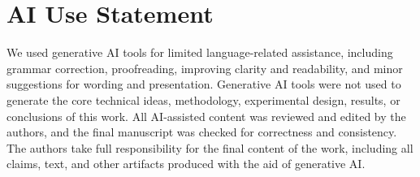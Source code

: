 \documentclass{article}
\begin{document}


\section*{AI Use Statement} 

We used generative AI tools for limited language-related assistance, including grammar correction, proofreading, improving clarity and readability, and minor suggestions for wording and presentation. Generative AI tools were not used to generate the core technical ideas, methodology, experimental design, results, or conclusions of this work. All AI-assisted content was reviewed and edited by the authors, and the final manuscript was checked for correctness and consistency. The authors take full responsibility for the final content of the work, including all claims, text, and other artifacts produced with the aid of generative AI.
\end{document}
